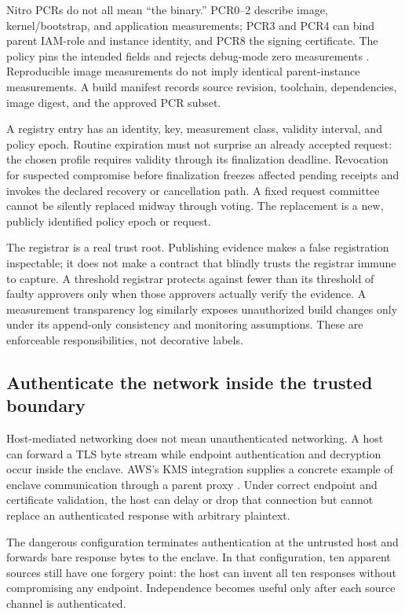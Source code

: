 Nitro PCRs do not all mean ``the binary.'' PCR0--2 describe image, kernel/bootstrap, and application measurements; PCR3 and PCR4 can bind parent IAM-role and instance identity, and PCR8 the signing certificate. The policy pins the intended fields and rejects debug-mode zero measurements \cite{nitropcr2026}. Reproducible image measurements do not imply identical parent-instance measurements. A build manifest records source revision, toolchain, dependencies, image digest, and the approved PCR subset.

A registry entry has an identity, key, measurement class, validity interval, and policy epoch. Routine expiration must not surprise an already accepted request: the chosen profile requires validity through its finalization deadline. Revocation for suspected compromise before finalization freezes affected pending receipts and invokes the declared recovery or cancellation path. A fixed request committee cannot be silently replaced midway through voting. The replacement is a new, publicly identified policy epoch or request.

The registrar is a real trust root. Publishing evidence makes a false registration inspectable; it does not make a contract that blindly trusts the registrar immune to capture. A threshold registrar protects against fewer than its threshold of faulty approvers only when those approvers actually verify the evidence. A measurement transparency log similarly exposes unauthorized build changes only under its append-only consistency and monitoring assumptions. These are enforceable responsibilities, not decorative labels.

\subsection{Authenticate the network inside the trusted boundary}

Host-mediated networking does not mean unauthenticated networking. A host can forward a TLS byte stream while endpoint authentication and decryption occur inside the enclave. AWS's KMS integration supplies a concrete example of enclave communication through a parent proxy \cite{nitrokms2026}. Under correct endpoint and certificate validation, the host can delay or drop that connection but cannot replace an authenticated response with arbitrary plaintext.

The dangerous configuration terminates authentication at the untrusted host and forwards bare response bytes to the enclave. In that configuration, ten apparent sources still have one forgery point: the host can invent all ten responses without compromising any endpoint. Independence becomes useful only after each source channel is authenticated.

